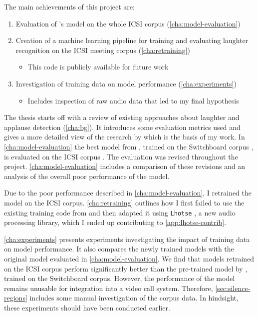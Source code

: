 \documentclass[bsc,frontabs,parskip,deptreport]{infthesis}
\begin{document}
The main achievements of this project are:
\begin{enumerate}
  \item Evaluation of \citeauthor{gillick2021robust}'s \citeyearpar{gillick2021robust} model on the whole ICSI corpus (\autoref{cha:model-evaluation})
  \item Creation of a machine learning pipeline for training and evaluating laughter recognition on the ICSI meeting corpus (\autoref{cha:retraining})
  \begin{itemize}
      \item This code is publicly available for future work \citep{Wolter_A_Machine_Learning_2022}
  \end{itemize}
  \item Investigation of training data on model performance (\autoref{cha:experiments})
  \begin{itemize}
      \item Includes inspection of raw audio data that led to my final hypothesis 
  \end{itemize}
\end{enumerate}


The thesis starts off with a review of existing approaches about laughter and applause detection (\autoref{cha:bg}). It introduces some evaluation metrics used and gives a more detailed view of the research by \citet{gillick2021robust} which is the basis of my work. In \autoref{cha:model-evaluation} the best model from \citet{gillick2021robust}, trained on the Switchboard corpus \citep{switchboard-corpus}, is evaluated on the ICSI corpus \citep{morgan2001meeting}. The evaluation was revised throughout the project. \autoref{cha:model-evaluation} includes a comparison of these revisions and an analysis of the overall poor performance of the model.

Due to the poor performance described in \autoref{cha:model-evaluation}, I retrained the model on the ICSI corpus. \autoref{cha:retraining} outlines how I first failed to use the existing training code from \citet{gillick2021robust} and then adapted it using \texttt{Lhotse} \citep{zelasko2021lhotse}, a new audio processing library, which I ended up contributing to \autoref{app:lhotse-contrib}.

\autoref{cha:experiments} presents experiments investigating the impact of training data on model performance. It also compares the newly trained models with the original model evaluated in \autoref{cha:model-evaluation}. We find that models retrained on the ICSI corpus perform significantly better than the pre-trained model by \citet{gillick2021robust}, trained on the Switchboard corpus. However, the performance of the model remains unusable for integration into a video call system. Therefore, \autoref{sec:silence-regions} includes some manual investigation of the corpus data. In hindsight, these experiments should have been conducted earlier. 
\end{document}
